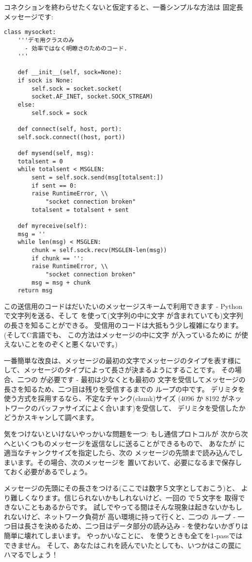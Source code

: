 \documentclass{howto}
\begin{document}
コネクションを終わらせたくないと仮定すると、一番シンプルな方法は
固定長メッセージです:

\begin{verbatim}
class mysocket:
    '''デモ用クラスのみ
      - 効率ではなく明瞭さのためのコード.
    '''

    def __init__(self, sock=None):
	if sock is None:
	    self.sock = socket.socket(
		socket.AF_INET, socket.SOCK_STREAM)
	else:
	    self.sock = sock

    def connect(self, host, port):
	self.sock.connect((host, port))

    def mysend(self, msg):
	totalsent = 0
	while totalsent < MSGLEN:
	    sent = self.sock.send(msg[totalsent:])
	    if sent == 0:
		raise RuntimeError, \\
		    "socket connection broken"
	    totalsent = totalsent + sent

    def myreceive(self):
	msg = ''
	while len(msg) < MSGLEN:
	    chunk = self.sock.recv(MSGLEN-len(msg))
	    if chunk == '':
		raise RuntimeError, \\
		    "socket connection broken"
	    msg = msg + chunk
	return msg
\end{verbatim}

この送信用のコードはだいたいのメッセージスキームで利用できます -
Pythonで文字列を送る、そして  を使って(文字列の中に文字
 が含まれていても)文字列の長さを知ることができる。
受信用のコードは大抵もう少し複雑になります。 (そしてC言語でも、
この方法はメッセージの中に文字  が入っているために
 が使えないことをのぞくと悪くないです。)


一番簡単な改良は、メッセージの最初の文字でメッセージのタイプを表す様に
して、メッセージのタイプによって長さが決まるようにすることです。
その場合、二つの  が必要です - 最初は少なくとも最初の
文字を受信してメッセージの長さを知るため、二つ目は残りを受信するまでの
ループの中です。
デリミタを使う方式を採用するなら、不定なチャンク(chunk)サイズ
(4096 か 8192 がネットワークのバッファサイズによく合います)を受信して、
デリミタを受信したかどうかスキャンして調べます。

気をつけないといけないやっかいな問題を一つ: もし通信プロトコルが
次から次へといくつものメッセージを返信なしに送ることができるもので、
あなたが  に適当なチャンクサイズを指定したら、次の
メッセージの先頭まで読み込んでしまいます。その場合、次のメッセージを
置いておいて、必要になるまで保存しておく必要があるでしょう。


メッセージの先頭にその長さをつける(ここでは数字５文字としておこう)と、
より難しくなります。信じられないかもしれないけど、一回の  で５文字を
取得できないこともあるからです。
試しでやってる間はそんな現象は起きないかもしれないけど、ネットワーク負荷が
高い環境に持って行くと、二つの  ループ
- 一つ目は長さを決めるため、二つ目はデータ部分の読み込み -
を使わないかぎりは簡単に壊れてしまいます。
やっかいなことに、 を使うときも全てを1-passではできません。
そして、あなたはこれを読んでいたとしても、いつかはこの罠にハマるでしょう！
\end{document}
